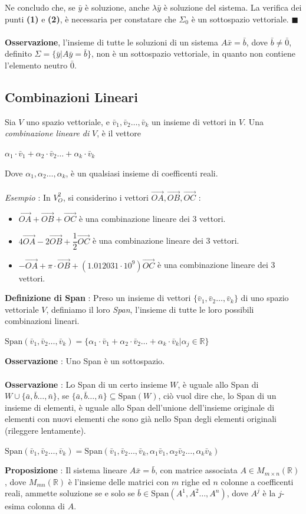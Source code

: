\documentclass[12pt, letterpaper]{article}
\newcommand{\R}{{\mathbb R}}
\newcommand{\acc}{\\\hphantom{}\\}
\newcommand{\Span}{{\text{Span}}}
\begin{document}
Ne concludo che, se \(\bar y\) è soluzione, anche \(\lambda \bar y\) è soluzione del sistema. La verifica 
dei punti \textbf{(1)} e \textbf{(2)}, è necessaria per constatare che \(\Sigma_0\) è un sottospazio vettoriale. \(\blacksquare\)
\acc \textbf{Osservazione}, l'insieme di tutte le soluzioni di un sistema \(A\bar x = \bar b\), dove 
\(\bar b \ne \bar 0\), definito \(\Sigma = \{\bar y | A\bar y = \bar b\}\), non è un sottospazio vettoriale, in 
quanto non contiene l'elemento neutro \(\bar 0\).
\subsection{Combinazioni Lineari}\label{combLin}
Sia \(V\) uno spazio vettoriale, e \(\bar v_1,\bar v_2\dots, \bar v_k\) un insieme di vettori in \(V\). 
Una \textit{combinazione lineare di }\(V\), è il vettore \begin{center}
    \(\alpha_1\cdot\bar v_1+\alpha_2\cdot\bar v_2\dots+ \alpha_k\cdot\bar v_k\)
\end{center}
Dove \(\alpha_1,\alpha_2\dots,\alpha_k\), è un qualsiasi insieme di coefficenti reali.\acc \textit{Esempio} : 
In \(V_O^2\), si considerino i vettori \(\vec{OA},\vec{OB},\vec{OC}\) : \begin{itemize}
    \item \(\vec{OA}+\vec{OB}+\vec{OC}\) è una combinazione lineare dei 3 vettori.
    \item \(4\vec{OA}-2\vec{OB}+\dfrac{1}{2}\vec{OC}\) è una combinazione lineare dei 3 vettori.
    \item \(-\vec{OA}+\pi\cdot \vec{OB}+(1.012031\cdot 10^9)\vec{OC}\) è una combinazione lineare dei 3 vettori.
\end{itemize}
\textbf{Definizione di Span} : Preso un insieme di vettori \(\{\bar v_1,\bar v_2\dots, \bar v_k\}\) di 
uno spazio vettoriale \(V\), definiamo il loro \textit{Span}, l'insieme di tutte le loro possibili combinazioni lineari.
\begin{center}
    \(\Span(\bar v_1,\bar v_2\dots, \bar v_k)=\{\alpha_1\cdot\bar v_1+\alpha_2\cdot\bar v_2\dots+ \alpha_k\cdot\bar v_k|\alpha_j\in \R\}\)
\end{center}
\textbf{Osservazione} : Uno Span è un sottospazio.\acc 
\textbf{Osservazione} : Lo Span di un certo insieme \(W\), è uguale allo Span di \(W\cup \{\bar a,\bar b\dots, \bar n\}\), se 
\(\{\bar a,\bar b\dots, \bar n\}\subseteq \Span(W)\), ciò vuol dire che, lo Span 
di un insieme di elementi, è uguale allo Span dell'unione dell'insieme originale di elementi con nuovi 
elementi che sono già nello Span degli elementi originali (rileggere lentamente).\begin{center}
    \(
    \Span(\bar v_1,\bar v_2\dots, \bar v_k)= \Span(\bar v_1,\bar v_2\dots, \bar v_k,\alpha_1\bar v_1,\alpha_2\bar v_2\dots, \alpha_k\bar v_k)
    \)
\end{center}
\textbf{Proposizione }: Il sistema lineare \(A\bar x = \bar b\), con matrice associata \(A\in M_{m\times n}(\R)\), dove 
\(M_{mn}(\R)\) è l'insieme delle matrici con \(m\) righe ed \(n\) colonne a coefficenti reali, ammette 
soluzione se e solo se \(\bar b \in \Span(A^1,A^2\dots, A^n)\), dove \(A^j\) è la \(j\)-esima colonna di \(A\). 
\end{document}
